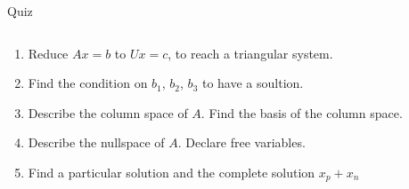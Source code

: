 \documentclass[aspectratio=169]{beamer}
\begin{document}
\begin{frame}[t]{Quiz}
\begin{columns}[T,onlytextwidth]
    \begin{column}{0.7\textwidth}
        \begin{enumerate}
            \item Reduce $Ax=b$ to $Ux=c$, to reach a triangular system.
            \item Find the condition on $b_1$, $b_2$, $b_3$ to have a soultion.
            \item Describe the column space of $A$. Find the basis of the column space.
            \item Describe the nullspace of $A$. Declare free variables.
            \item Find a particular solution and the complete solution $x_p + x_n$
        \end{enumerate}
    \end{column}
\end{columns}
\end{frame}
\end{document}
